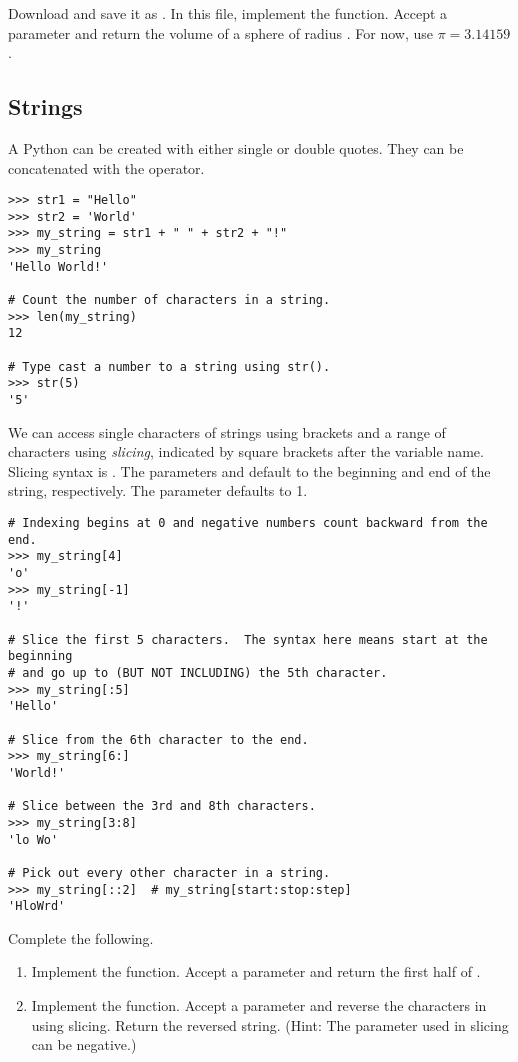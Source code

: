 \begin{problem}
Download  and save it as .
In this file, implement the  function.
Accept a parameter  and return the volume of a sphere of radius .
For now, use $\pi=3.14159$.
\end{problem}


\subsection*{Strings}
A Python  can be created with either single or double quotes.
They can be concatenated with the \li{+} operator.
\begin{lstlisting}
>>> str1 = "Hello"
>>> str2 = 'World'
>>> my_string = str1 + " " + str2 + "!"
>>> my_string
'Hello World!'

# Count the number of characters in a string.
>>> len(my_string)
12

# Type cast a number to a string using str().
>>> str(5)
'5'
\end{lstlisting}

We can access single characters of strings using brackets and a range of characters using \emph{slicing}, indicated by square brackets \li{[ ]} after the variable name.
Slicing syntax is .
The parameters  and  default to the beginning and end of the string, respectively.
The parameter  defaults to 1.

\begin{lstlisting}
# Indexing begins at 0 and negative numbers count backward from the end.
>>> my_string[4]
'o'
>>> my_string[-1]
'!'

# Slice the first 5 characters.  The syntax here means start at the beginning
# and go up to (BUT NOT INCLUDING) the 5th character.
>>> my_string[:5]
'Hello'

# Slice from the 6th character to the end.
>>> my_string[6:]
'World!'

# Slice between the 3rd and 8th characters.
>>> my_string[3:8]
'lo Wo'

# Pick out every other character in a string.
>>> my_string[::2]	# my_string[start:stop:step]
'HloWrd'
\end{lstlisting}

\begin{problem}
Complete the following.
\begin{enumerate}
\item Implement the  function. Accept a parameter  and return the first half of .
\item Implement the  function. Accept a parameter  and reverse the characters in  using slicing.
Return the reversed string.
(Hint: The  parameter used in slicing can be negative.)
\end{enumerate}
\end{problem}

